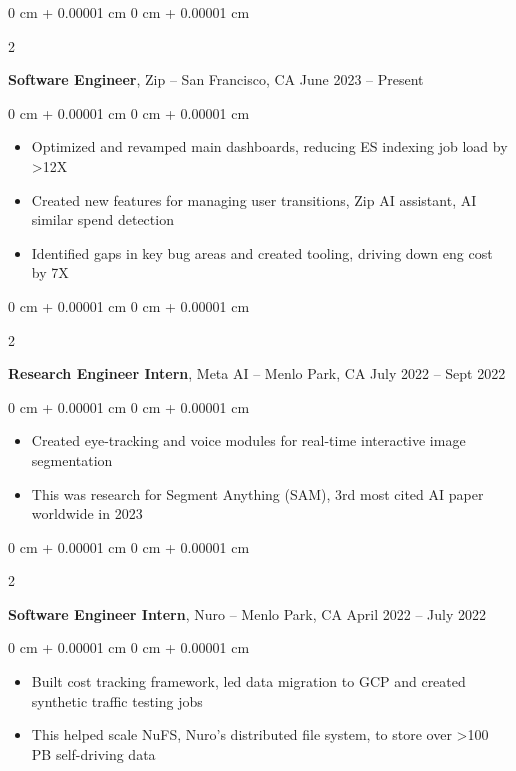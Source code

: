 \documentclass[10pt, letterpaper]{article}
\newenvironment{highlights}{
    \begin{itemize}[
        topsep=0.10 cm,
        parsep=0.10 cm,
        partopsep=0pt,
        itemsep=0pt,
        leftmargin=0 cm + 10pt
    ]
}{
    \end{itemize}
} %
\newenvironment{onecolentry}{
    \begin{adjustwidth}{
        0 cm + 0.00001 cm
    }{
        0 cm + 0.00001 cm
    }
}{
    \end{adjustwidth}
} %
\newenvironment{twocolentry}[2][]{
    \onecolentry
    \def\secondColumn{#2}
    \setcolumnwidth{\fill, 4.5 cm}
    \begin{paracol}{2}
}{
    \switchcolumn \raggedleft \secondColumn
    \end{paracol}
    \endonecolentry
} %
\begin{document}
        
        \begin{twocolentry}{
            June 2023 – Present
        }
            \textbf{Software Engineer}, Zip -- San Francisco, CA\end{twocolentry}

        \vspace{0.10 cm}
        \begin{onecolentry}
            \begin{highlights}
                \item Optimized and revamped main dashboards, reducing ES indexing job load by >12X
                \item Created new features for managing user transitions, Zip AI assistant, AI similar spend detection
                \item Identified gaps in key bug areas and created tooling, driving down eng cost by 7X
            \end{highlights}
        \end{onecolentry}


        \vspace{0.2 cm}

        \begin{twocolentry}{
            July 2022 – Sept 2022
        }
            \textbf{Research Engineer Intern}, Meta AI -- Menlo Park, CA\end{twocolentry}

        \vspace{0.10 cm}
        \begin{onecolentry}
            \begin{highlights}
                \item Created eye-tracking and voice modules for real-time interactive image segmentation
                \item This was research for Segment Anything (SAM), 3rd most cited AI paper worldwide in 2023
            \end{highlights}
        \end{onecolentry}

        \vspace{0.2 cm}


        \begin{twocolentry}{
            April 2022 – July 2022
        }
            \textbf{Software Engineer Intern}, Nuro -- Menlo Park, CA\end{twocolentry}

        \vspace{0.10 cm}
        \begin{onecolentry}
            \begin{highlights}
                \item Built cost tracking framework, led data migration to GCP and created synthetic traffic testing jobs
                \item This helped scale NuFS, Nuro's distributed file system, to store over >100 PB self-driving data
            \end{highlights}
        \end{onecolentry}
\end{document}
